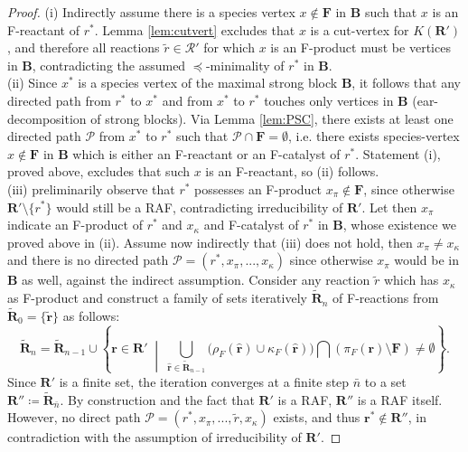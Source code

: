 \documentclass[pdflatex]{sn-jnl}
\theoremstyle{thmstyleone}%
\theoremstyle{examplesty}%
\theoremstyle{thmstylethree}%
\newcommand{\king}{K}
\newcommand{\food}{\ensuremath{\mathbf{F}}}
\newcommand{\fr}[0]{\mathbf{r}}
\newcommand{\RAF}[0]{\mathbf{R}'}
\newcommand{\block}[0]{\mathbf{B}}
\newcommand{\cat}{\kappa_F}
\newcommand{\feducts}{\rho_F}
\newcommand{\fproducts}{\pi_F}
\begin{document}
\begin{proof}
  (i) Indirectly assume there is a species vertex $x\not\in \food$ in
  $\block$ such that $x$ is an F-reactant of $r^*$. Lemma \ref{lem:cutvert}
  excludes that $x$ is a cut-vertex for $\king(\RAF)$, and therefore all
  reactions $\tilde{r}\in \mathcal{R}'$ for which $x$ is an F-product must
  be vertices in $\block$, contradicting the assumed $\preceq$-minimality
  of $r^*$ in $\block$.
  \\
  (ii) Since $x^*$ is a species vertex of the maximal strong block
  $\block$, it follows that any directed path from $r^*$ to $x^*$ and from
  $x^*$ to $r^*$ touches only vertices in $\block$ (ear-decomposition of
  strong blocks). Via Lemma \ref{lem:PSC}, there exists at least one
  directed path $\mathcal{P}$ from $x^*$ to $r^*$ such that
  $\mathcal{P}\cap \food =\emptyset$, i.e. there exists species-vertex
  $x\not\in\food$ in $\block$ which is either an F-reactant or an
  F-catalyst of $r^*$. Statement (i), proved above, excludes that such $x$
  is an F-reactant, so (ii) follows.
  \\
  (iii) preliminarily observe that $r^*$ possesses an F-product
  $x_\pi \not\in \food$, since otherwise $\RAF \setminus \{r^*\}$ would still
  be a RAF, contradicting irreducibility of $\RAF$. Let then $x_\pi$
  indicate an F-product of $r^*$ and $x_\kappa$ and F-catalyst of $r^*$ in
  $\block$, whose existence we proved above in (ii). Assume now indirectly
  that (iii) does not hold, then $x_\pi\neq x_\kappa$ and there is no
  directed path $\mathcal{P}=(r^*, x_\pi,...,x_\kappa)$ since otherwise
  $x_\pi$ would be in $\block$ as well, against the indirect
  assumption. Consider any reaction $\tilde{r}$ which has $x_\kappa$ as
  F-product and construct a family of sets iteratively
  $\tilde{\mathbf{R}}_n$ of F-reactions from
  $\tilde{\mathbf{R}}_0=\{\tilde{\fr}\}$ as follows:
  \begin{equation}\label{RAFbuild}
    \tilde{\mathbf{R}}_{n}=\tilde{\mathbf{R}}_{n-1}\cup
    \left\{\fr\in \RAF \; \middle| \; \bigcup_{\hat{\fr}\in \tilde{\mathbf{R}}_{n-1}}
    \bigg(\feducts(\hat{\fr}) \cup \cat(\hat{\fr})\bigg)
    \bigcap \left( \fproducts(\fr) \setminus \food \right) \neq \emptyset \right\}.
  \end{equation}
  Since $\RAF$ is a finite set, the iteration converges at a finite step
  $\bar{n}$ to a set $\RAF'\coloneqq \tilde{\mathbf{R}}_{\bar{n}}$.  By
  construction and the fact that $\RAF$ is a RAF, $\RAF'$ is a RAF
  itself. However, no direct path
  $\mathcal{P}=(r^*, x_\pi,..., \tilde{r},x_\kappa)$ exists, and thus
  $\fr^*\not\in \RAF'$, in contradiction with the assumption of
  irreducibility of $\RAF$.
 \end{proof}
\end{document}
